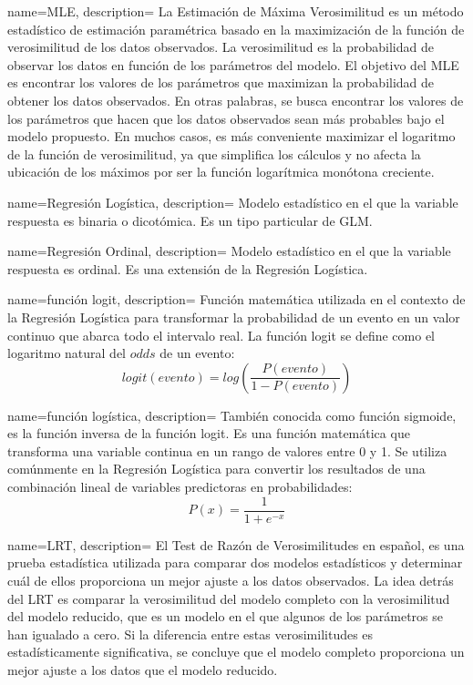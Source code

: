 {
    name=MLE,
    description={
        La Estimación de Máxima Verosimilitud es un método estadístico de estimación paramétrica
        basado en la maximización de la función de verosimilitud de los datos observados.
        La verosimilitud es la probabilidad de observar los datos en función de los parámetros del modelo.
        El objetivo del MLE es encontrar los valores de los parámetros que maximizan
        la probabilidad de obtener los datos observados.
        En otras palabras, se busca encontrar los valores de los parámetros que hacen que los datos observados
        sean más probables bajo el modelo propuesto.
        En muchos casos, es más conveniente maximizar el logaritmo de la función de verosimilitud,
        ya que simplifica los cálculos y no afecta la ubicación de los máximos por ser la función logarítmica
        monótona creciente.        
        }
}


{
    name=Regresión Logística,
    description={
        Modelo estadístico en el que la variable respuesta es binaria o dicotómica. Es un tipo particular de \gls{GLM}.}
}


{
    name=Regresión Ordinal,
    description={
        Modelo estadístico en el que la variable respuesta es ordinal. Es una extensión de la \gls{Regresión Logística}.}
}


{
    name=función logit,
    description={
        Función matemática utilizada en el contexto de la \gls{Regresión Logística} para transformar
        la probabilidad de un evento en un valor continuo que abarca todo el intervalo real.
        La función logit se define como el logaritmo natural del $odds$ de un evento:        
        $$
        logit(evento) = log (\frac{P(evento)}{1-P(evento)})
        $$
    }
}


{
    name=función logística,
    description={
        También conocida como función sigmoide, es la función inversa de la \gls{función logit}.
        Es una función matemática que transforma una variable continua en un rango de valores entre 0 y 1.
        Se utiliza comúnmente en la \gls{Regresión Logística} para convertir los resultados de una combinación lineal
        de variables predictoras en probabilidades:
        $$
        P(x) = \frac{1}{1 + e^{-x}}
        $$
    }
}



{
    name=LRT,
    description={
        El Test de Razón de Verosimilitudes en español, es una prueba estadística utilizada
        para comparar dos modelos estadísticos y determinar cuál de ellos proporciona un mejor ajuste
        a los datos observados.
        La idea detrás del LRT es comparar la verosimilitud del modelo completo con la verosimilitud
        del modelo reducido, que es un modelo en el que algunos de los parámetros se han igualado a cero.
        Si la diferencia entre estas verosimilitudes es estadísticamente significativa,
        se concluye que el modelo completo proporciona un mejor ajuste a los datos que el modelo reducido.
    }
}


